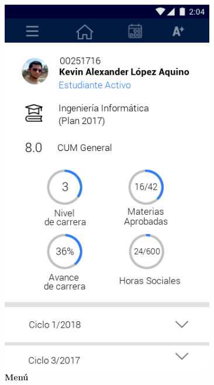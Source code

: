 \documentclass[12pt]{article}
\begin{document}
\begin{figure}[t]
\begin{minipage}[t]{0.45\textwidth}
		\includegraphics[width=0.825\textwidth]{img/8.png}
	\end{minipage}\hfill
	\begin{minipage}[t]{0.45\textwidth}
		\centering
		\caption{\textbf{Menú}}

\end{minipage}
\end{figure}
\end{document}
